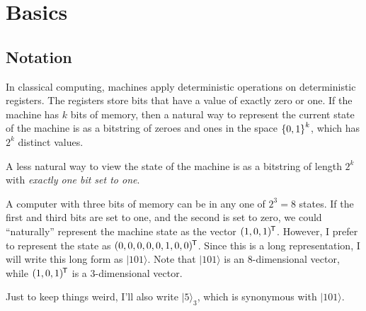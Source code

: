 \newcommand{\braket}[1]{|#1\rangle}

\section{Basics}

\subsection{Notation}

\begin{remark}
  In classical computing, machines apply deterministic operations on
  deterministic registers. The registers store bits that have a value of
  exactly zero or one. If the machine has $k$ bits of memory, then a
  natural way to represent the current state of the machine is as a
  bitstring of zeroes and ones in the space $\left\{ 0, 1 \right\}^k$, which has
  $2^k$ distinct values.
\end{remark}

\begin{remark}
  A less natural way to view the state of the machine is as a bitstring
  of length $2^k$ with \emph{exactly one bit set to one}.
\end{remark}

\begin{example}
  A computer with three bits of memory can be in any one of $2^3 = 8$
  states. If the first and third bits are set to one, and the second is
  set to zero, we could ``naturally'' represent the machine state as the
  vector $\mathopen{}\left( {1, 0 , 1} \right)\mathclose{}^{\mkern-1.5mu\mathsf{T}}$. However, I prefer to represent the
  state as $\mathopen{}\left( {0, 0, 0, 0, 0, 1, 0, 0} \right)\mathclose{}^{\mkern-1.5mu\mathsf{T}}$. Since this is a long
  representation, I will write this long form as $\braket{101}$. Note
  that $\braket{101}$ is an 8-dimensional vector, while $\mathopen{}\left( {1, 0,
  1} \right)\mathclose{}^{\mkern-1.5mu\mathsf{T}}$ is a 3-dimensional vector.

  Just to keep things weird, I'll also write $\braket{5}_3$, which is
  synonymous with $\braket{101}$.
\end{example}

